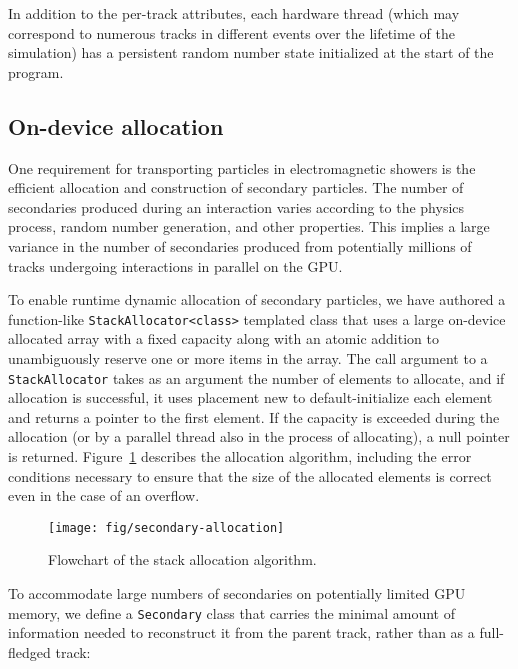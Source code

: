 In addition to the per-track attributes, each hardware thread
(which may correspond to numerous tracks in different events over the lifetime
of the simulation) has a persistent random number state initialized at the start
of the program.

\subsection{On-device allocation}\label{on-device-allocation}

One requirement for transporting particles in electromagnetic showers is
the efficient allocation and construction of secondary particles. The
number of secondaries produced during an interaction varies according to
the physics process, random number generation, and other properties.
This implies a large variance in the number of secondaries produced from
potentially millions of tracks undergoing interactions in parallel on
the GPU.

To enable runtime dynamic allocation of secondary particles, we have
authored a function-like
\texttt{StackAllocator\textless{}class\textgreater{}} templated class
that uses a large on-device allocated array with a fixed capacity along
with an atomic addition to unambiguously reserve one or more items in
the array. The call argument to a \texttt{StackAllocator} takes as an
argument the number of elements to allocate, and if allocation is
successful, it uses placement new to default-initialize each element and
returns a pointer to the first element. If the capacity is exceeded
during the allocation (or by a parallel thread also in the process of
allocating), a null pointer is returned. Figure~\ref{fig:secondary} describes
the allocation algorithm, including the error conditions necessary to ensure
that the size of the allocated elements is correct even in the case of an
overflow.
%
\begin{figure}[htb]
  \centering
  \texttt{[image: fig/secondary-allocation]}
  \caption{Flowchart of the stack allocation algorithm.}
  \label{fig:secondary}
\end{figure}

To accommodate large numbers of secondaries on potentially limited GPU
memory, we define a \texttt{Secondary} class that carries the minimal
amount of information needed to reconstruct it from the parent track,
rather than as a full-fledged track:

\begin{Shaded}
\begin{Highlighting}[]
\NormalTok{\{}
\NormalTok{\};}
\end{Highlighting}
\end{Shaded}

